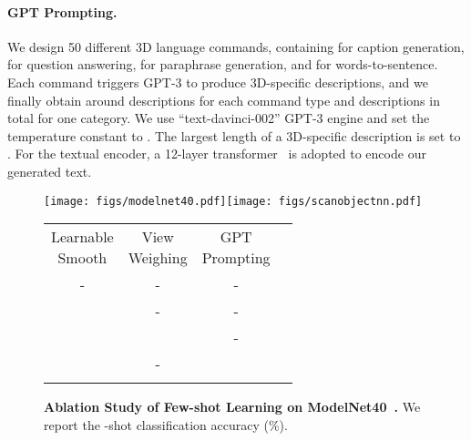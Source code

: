 \documentclass[10pt,twocolumn,letterpaper]{article}
\makeatletter
\newcommand\tabcaption{\def\@captype{table}\caption}
\makeatother
\begin{document}
\vspace{-0.1cm}
\paragraph{GPT Prompting.} 
We design 50 different 3D language commands, containing  for caption generation,  for question answering,  for paraphrase generation, and  for words-to-sentence. Each command triggers GPT-3 to produce  3D-specific descriptions, and we finally obtain around  descriptions for each command type and  descriptions in total for one category. We use ``text-davinci-002'' GPT-3 engine and set the temperature constant to . The largest length of a 3D-specific description is set to . For the textual encoder, a 12-layer transformer~\cite{vaswani2017attention} is adopted to encode our generated text.

\begin{figure*}[t]
\vspace{5pt}
\begin{minipage}[c]{0.60\textwidth}
\centering
\hspace{-10pt}
\texttt{[image: figs/modelnet40.pdf]}\hspace{10pt}\texttt{[image: figs/scanobjectnn.pdf]}
\caption{\textbf{Few-shot 3D Classification on ModelNet40~\cite{wu20153d} and ScanObjectNN~\cite{uy2019revisiting}.} We adopt the PB\_T50\_RS split of ScanObjectNN for comparison.}
\label{fig:few_shot_classification}
\end{minipage}\hspace{10pt}
\begin{minipage}[c]{0.33\textwidth}
\vspace{9pt}
\begin{adjustbox}{width=5.9cm}
	\begin{tabular}{cccc}
	\toprule
	\makecell[c]{Learnable\\ Smooth} & \makecell[c]{View\\ Weighing} & \makecell[c]{GPT\\ Prompting} & \makecell[c]{-shot} \\ \cmidrule(lr){1-4}
	- & - & - & \\
	\checkmark & - & - & \\
	\checkmark & \checkmark & - & \\
	\checkmark & - & \checkmark & \\ 
	\checkmark & \checkmark & \checkmark &  \\ 
	\bottomrule
	\end{tabular}
	\end{adjustbox}
	\vspace{5pt}
    \tabcaption{\textbf{Ablation Study of Few-shot Learning on ModelNet40~\cite{wu20153d}.} We report the -shot classification accuracy (\%). }
\label{table:few_ablation}
\end{minipage}\hspace{17pt}
\end{figure*}
\end{document}
